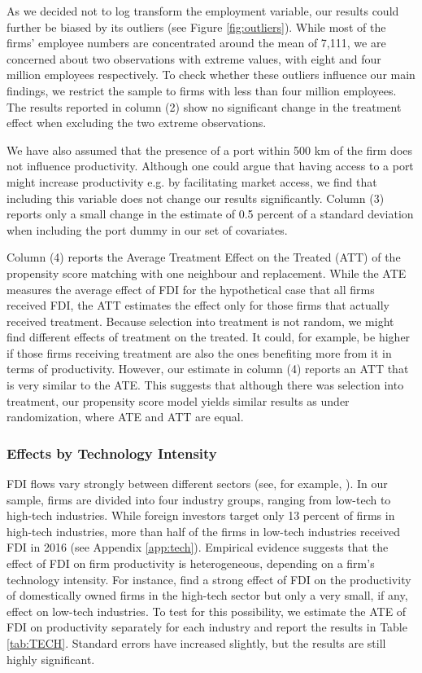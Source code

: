 \documentclass[a4paper,11pt]{scrartcl}
\begin{document}
As we decided not to log transform the employment variable, our results could further be biased by its outliers (see Figure \ref{fig:outliers}). While most of the firms' employee numbers are concentrated around the mean of 7,111, we are concerned about two observations with extreme values, with eight and four million employees respectively. To check whether these outliers influence our main findings, we restrict the sample to firms with less than four million employees. The results reported in column (2) show no significant change in the treatment effect when excluding the two extreme observations. 

We have also assumed that the presence of a port within 500 km of the firm does not influence productivity. Although one could argue that having access to a port might increase productivity e.g. by facilitating market access, we find that including this variable does not change our results significantly.  Column (3) reports only a small change in the estimate of 0.5 percent of a standard deviation when including the port dummy in our set of covariates. 

Column (4) reports the Average Treatment Effect on the Treated (ATT) of the propensity score matching with one neighbour and replacement. While the ATE measures the average effect of FDI for the hypothetical case that all firms received FDI, the ATT estimates the effect only for those firms that actually received treatment. Because selection into treatment is not random, we might find different effects of treatment on the treated. 
It could, for example, be higher if those firms receiving treatment are also the ones benefiting more from it in terms of productivity. 
However, our estimate in column (4) reports an ATT that is very similar to the ATE. This suggests that although there was selection into treatment, our propensity score model yields similar results as under randomization, where ATE and ATT are equal.

\subsubsection*{Effects by Technology Intensity}

FDI flows vary strongly between different sectors (see, for example, \citet{Smarzynska2004, Keller2009, Haskel2007}). In our sample, firms are divided into four industry groups, ranging from low-tech to high-tech industries. While foreign investors target only 13 percent of firms in high-tech industries, more than half of the firms in low-tech industries received FDI in 2016 (see Appendix \ref{app:tech}). Empirical evidence suggests that the effect of FDI on firm productivity is heterogeneous, depending on a firm's technology intensity.
For instance, \citet{Keller2009} find a strong effect of FDI on the productivity of domestically owned firms in the high-tech sector but only a very small, if any, effect on low-tech industries. 
To test for this possibility, we estimate the ATE of FDI on productivity separately for each industry and report the results in Table \ref{tab:TECH}. Standard errors have increased slightly, but the results are still highly significant. 
\end{document}
